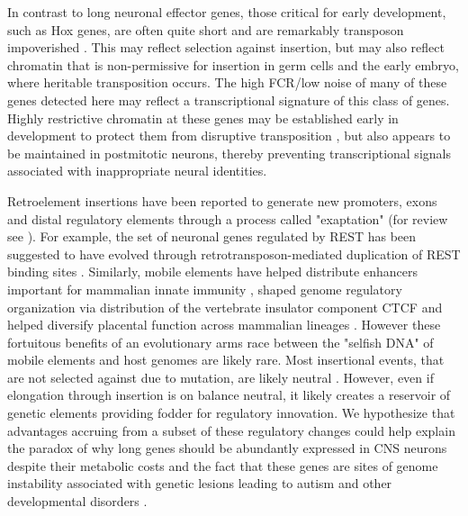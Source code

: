 In contrast to long neuronal effector genes, those critical for early development, such as Hox genes, are often quite short and are remarkably transposon impoverished \citep{Chinwalla_2002,Simons_2005}. This may reflect selection against insertion, but may also reflect chromatin that is non-permissive for insertion in germ cells and the early embryo, where heritable transposition occurs. The high FCR/low noise of many of these genes detected here may reflect a transcriptional signature of this class of genes. Highly restrictive chromatin at these genes may be established early in development to protect them from disruptive transposition \citep{Montavon_2014}, but also appears to be maintained in postmitotic neurons, thereby preventing transcriptional signals associated with inappropriate neural identities. 

Retroelement insertions have been reported to generate new promoters, exons and distal regulatory elements through a process called "exaptation" (for review see \cite{Chuong_2016}). For example, the set of neuronal genes regulated by REST has been suggested to have evolved through retrotransposon-mediated duplication of REST binding sites \citep{Johnson_2006}. Similarly, mobile elements have helped distribute enhancers important for mammalian innate immunity \cite{Chuong_2016a}, shaped genome regulatory organization via distribution of the vertebrate insulator component CTCF \citep{Schmidt_2012} and helped diversify placental function across mammalian lineages \citep{Chuong_2013}. However these fortuitous benefits of an evolutionary arms race between the "selfish DNA" of mobile elements and host genomes are likely rare. Most insertional events, that are not selected against due to mutation, are likely neutral \cite{Zhang_2011}. However, even if elongation through insertion is on balance neutral, it likely creates a reservoir of genetic elements providing fodder for regulatory innovation. We hypothesize that advantages accruing from a subset of these regulatory changes could help explain the paradox of why long genes should be abundantly expressed in CNS neurons despite their metabolic costs and the fact that these genes are sites of genome instability associated with genetic lesions leading to autism and other developmental disorders \citep{Wei_2016}. 




